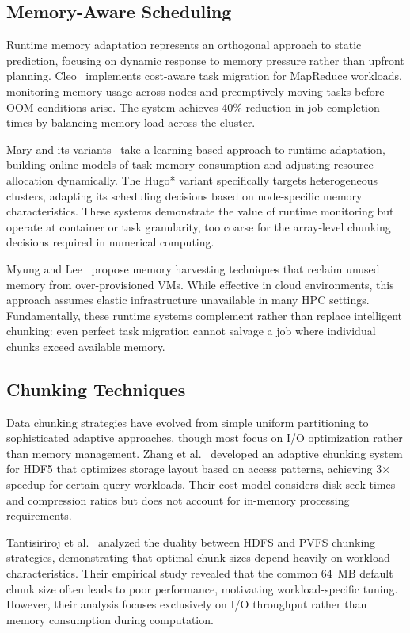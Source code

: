 \subsection{Memory-Aware Scheduling}

Runtime memory adaptation represents an orthogonal approach to static prediction, focusing on dynamic response to memory pressure rather than upfront planning.
Cleo~\cite{khandelwal2020} implements cost-aware task migration for MapReduce workloads, monitoring memory usage across nodes and preemptively moving tasks before OOM conditions arise.
The system achieves 40\% reduction in job completion times by balancing memory load across the cluster.

Mary and its variants~\cite{thamsen2017} take a learning-based approach to runtime adaptation, building online models of task memory consumption and adjusting resource allocation dynamically.
The Hugo* variant specifically targets heterogeneous clusters, adapting its scheduling decisions based on node-specific memory characteristics.
These systems demonstrate the value of runtime monitoring but operate at container or task granularity, too coarse for the array-level chunking decisions required in numerical computing.

Myung and Lee~\cite{myung2021} propose memory harvesting techniques that reclaim unused memory from over-provisioned VMs.
While effective in cloud environments, this approach assumes elastic infrastructure unavailable in many \ac{HPC} settings.
Fundamentally, these runtime systems complement rather than replace intelligent chunking: even perfect task migration cannot salvage a job where individual chunks exceed available memory.

\subsection{Chunking Techniques}

Data chunking strategies have evolved from simple uniform partitioning to sophisticated adaptive approaches, though most focus on I/O optimization rather than memory management.
Zhang et al.~\cite{zhang2019} developed an adaptive chunking system for HDF5 that optimizes storage layout based on access patterns, achieving 3× speedup for certain query workloads.
Their cost model considers disk seek times and compression ratios but does not account for in-memory processing requirements.

Tantisiriroj et al.~\cite{tantisiriroj2011} analyzed the duality between HDFS and PVFS chunking strategies, demonstrating that optimal chunk sizes depend heavily on workload characteristics.
Their empirical study revealed that the common 64~MB default chunk size often leads to poor performance, motivating workload-specific tuning.
However, their analysis focuses exclusively on I/O throughput rather than memory consumption during computation.

